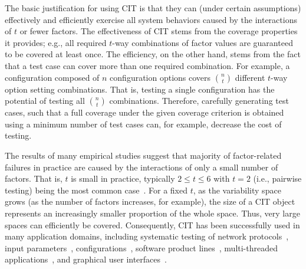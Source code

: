\documentclass[EPiCempty]{easychair}
\begin{document}
The basic justification for using CIT is that they can (under certain assumptions) effectively and efficiently exercise all system behaviors caused by the interactions of $t$ or fewer factors. The effectiveness of CIT stems from the coverage properties it provides; e.g., all required $t$-way combinations of factor values are guaranteed to be covered at least once. The efficiency, on the other hand, stems from the fact that a test case can cover more than one required combination. For example, a configuration composed of $n$ configuration options covers $n \choose t$ different $t$-way option setting combinations. That is, testing a single configuration has the potential of testing all $n \choose t$ combinations. Therefore, carefully generating test cases, such that a full coverage under the given coverage criterion is obtained using a minimum number of test cases can, for example,  decrease the cost of testing.

The results of many empirical studies suggest that majority of factor-related failures in practice are caused by the interactions of only a small number of factors. That is, $t$ is small in practice, typically $2 \leq t \leq 6$ with $t$$=$$2$ (i.e., pairwise testing) being the most common case~\cite{cohen1996combinatorial,cohen1997aetg,czerwonka2006pairwise,dalal1998model}. For a fixed $t$, as the variability space grows (as the number of factors increases, for example), the size of a CIT object represents an increasingly smaller proportion of the whole space. Thus, very large spaces can efficiently be covered. Consequently, CIT has been successfully used in many application domains, including systematic testing of network protocols~\cite{burroughs1994improved,williams1996practical}, input parameters~\cite{schroeder2002generating}, configurations~\cite{kuhn2008practical,yilmaz2006covering}, software product lines~\cite{johansen2012algorithm}, multi-threaded applications~\cite{lei2007combinatorial}, and graphical user interfaces~\cite{yuan2011gui}. 
\end{document}
